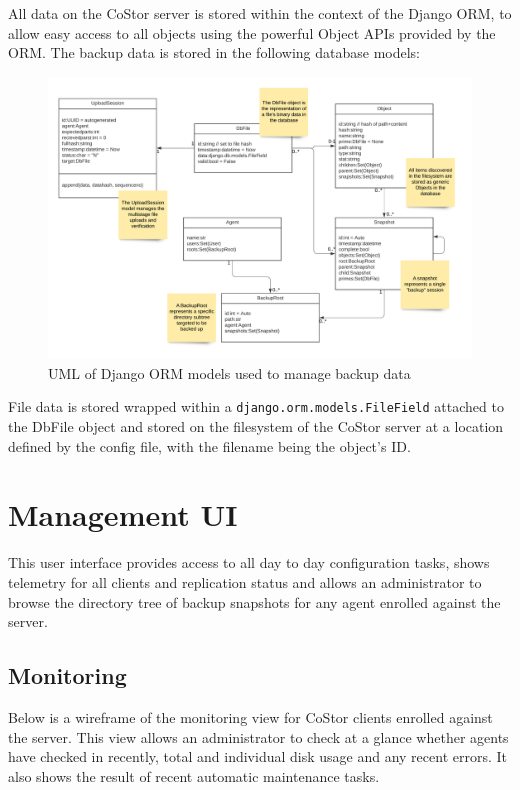 \documentclass[bsc,frontabs,twoside,singlespacing,parskip,deptreport]{infthesis}     %
\begin{document}
All data on the CoStor server is stored within the context of the Django ORM, to allow easy access
to all objects using the powerful Object APIs provided by the ORM. The backup data is stored in the
following database models:

\begin{figure}[h]
	\includegraphics[width=0.82\paperwidth]{img/serverfileuml}
	\caption{UML of Django ORM models used to manage backup data}
	\label{serverdjangofileuml}
\end{figure}

File data is stored wrapped within a \texttt{django.orm.models.FileField} attached to the DbFile 
object and stored on the filesystem of the CoStor server at a location defined by the config file,
with the filename being the object's ID.

\section{Management UI}

This user interface provides access to all day to day configuration tasks, shows telemetry for
all clients and replication status and allows an administrator to browse the directory tree of
backup snapshots for any agent enrolled against the server.

\subsection{Monitoring}

Below is a wireframe of the monitoring view for CoStor clients enrolled against the server. This
view allows an administrator to check at a glance whether agents have checked in recently, total
and individual disk usage and any recent errors. It also shows the result of recent automatic 
maintenance tasks.
\end{document}

